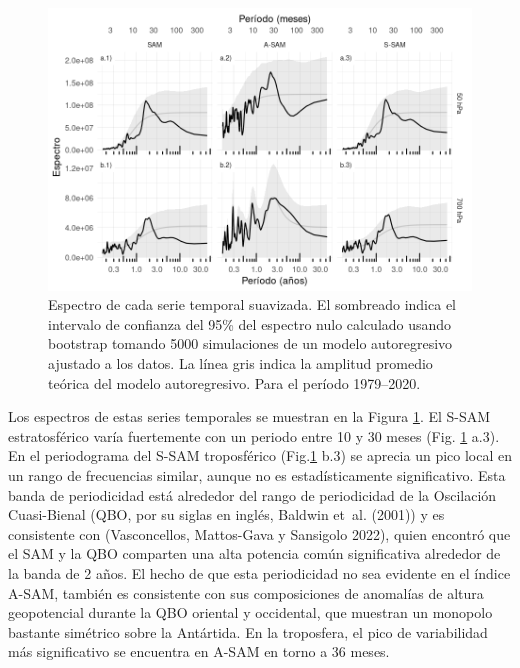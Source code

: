 \documentclass[12pt,oneside,a4paper]{reedthesis}
\begin{document}
\begin{figure}

{\centering \includegraphics{figures/30-sam/spectrum-1} 

}

\caption{Espectro de cada serie temporal suavizada. El sombreado indica el intervalo de confianza del 95\% del espectro nulo calculado usando bootstrap tomando 5000 simulaciones de un modelo autoregresivo ajustado a los datos. La línea gris indica la amplitud promedio teórica del modelo autoregresivo. Para el período 1979--2020.}\label{fig:spectrum}
\end{figure}

Los espectros de estas series temporales se muestran en la Figura \ref{fig:spectrum}.
El S-SAM estratosférico varía fuertemente con un periodo entre 10 y 30 meses (Fig. \ref{fig:spectrum} a.3).
En el periodograma del S-SAM troposférico (Fig.\ref{fig:spectrum} b.3) se aprecia un pico local en un rango de frecuencias similar, aunque no es estadísticamente significativo.
Esta banda de periodicidad está alrededor del rango de periodicidad de la Oscilación Cuasi-Bienal (QBO, por su siglas en inglés, Baldwin et~al. (2001)) y es consistente con (Vasconcellos, Mattos-Gava y Sansigolo 2022), quien encontró que el SAM y la QBO comparten una alta potencia común significativa alrededor de la banda de 2 años.
El hecho de que esta periodicidad no sea evidente en el índice A-SAM, también es consistente con sus composiciones de anomalías de altura geopotencial durante la QBO oriental y occidental, que muestran un monopolo bastante simétrico sobre la Antártida.
En la troposfera, el pico de variabilidad más significativo se encuentra en A-SAM en torno a 36 meses.
\end{document}
